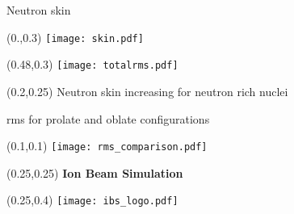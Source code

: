 \documentclass[10pt,aspectratio=169]{beamer}
\begin{document}
\begin{frame}{Neutron skin}

    \centering 
    \begin{textblock*}{0.5\paperwidth}(0.\paperwidth,0.3\paperheight)
        \centering
        \texttt{[image: skin.pdf]}
    \end{textblock*}
    \begin{textblock*}{0.5\paperwidth}(0.48\paperwidth,0.3\paperheight)
        \centering
        \texttt{[image: totalrms.pdf]}
    \end{textblock*}
    \begin{textblock*}{0.6\paperwidth}(0.2\paperwidth,0.25\paperheight)
            Neutron skin increasing for neutron rich nuclei
    \end{textblock*}

\end{frame}

\begin{frame}{rms for prolate and oblate configurations}

    \centering 
    \begin{textblock*}{0.8\paperwidth}(0.1\paperwidth,0.1\paperheight)
        \centering
        \texttt{[image: rms\_comparison.pdf]}
    \end{textblock*}

\end{frame}


\begin{SectionTitle}
	\begin{frame}
		\begin{textblock*}{0.5\paperwidth}(0.25\paperwidth,0.25\paperheight)
			\centering
			\textbf{\LARGE Ion Beam Simulation}
		\end{textblock*}
		\begin{textblock*}{0.5\paperwidth}(0.25\paperwidth,0.4\paperheight)
			\centering
			\texttt{[image: ibs\_logo.pdf]}
		\end{textblock*}
	\end{frame}
 \end{SectionTitle}
\end{document}
